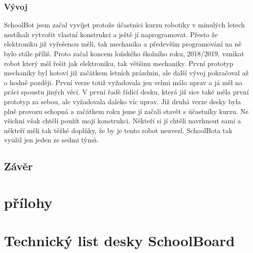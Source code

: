 \documentclass{template/socthesis}
\begin{document}
\section{Vývoj}
SchoolBot jsem začal vyvíjet protože účastníci kurzu robotiky v minulých letech nestíhali vytvořit vlastní konstrukci a ještě jí naprogramovat. Přesto že elektroniku již vyřešenou měli, tak mechanika a především programování na ně bylo stále příliš. Proto začal koncem loňského školního roku, 2018/2019, vznikat robot který měl řešit jak elektroniku, tak většinu mechaniky. 
První prototyp mechaniky byl hotoví již začátkem letních prázdnin, ale další vývoj pokračoval až o hodně později. První verze totiž vyžadovala jen velmi málo uprav a já měl na práci spoustu jiných věcí. V první řadě řídící desku, která již sice také měla první prototyp za sebou, ale vyžadovala daleko víc uprav. Již druhá verze desky byla plně provozu schopná a začátkem roku jsme jí začali stavět s účastníky kurzu. Ne všichni však chtěli použít mojí konstrukci. Někteří si jí chtěli navrhnout sami a někteří měli tak těžké doplňky, že by je tento robot neuvezl. SchoolBota tak využil jen jeden ze sedmi týmů.

\chapter*{Závěr}

\newpage
\printbibliography[title=Literatura]

\listoffigures
{}

\listoftables
{}

\listoflistedequation
{}


\newpage

\part{přílohy}
\part*{Technický list desky SchoolBoard}
\end{document}
